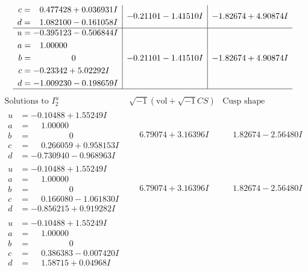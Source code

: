 \documentclass[1p]{elsarticle_modified}
\theoremstyle{definition}
\newcommand{\I}{\sqrt{-1}}
\begin{document}
$$\begin{array}{c|c|c}
\begin{aligned}
c &= \phantom{-}0.477428 + 0.036931 I \\
d &= \phantom{-}1.082100 - 0.161058 I\end{aligned}
 & -0.21101 - 1.41510 I & -1.82674 + 4.90874 I \\ \hline\begin{aligned}
u &= -0.395123 - 0.506844 I \\
a &= \phantom{-}1.00000\phantom{ +0.000000I} \\
b &= \phantom{-0.000000 } 0 \\
c &= -0.23342 + 5.02292 I \\
d &= -1.009230 - 0.198659 I\end{aligned}
 & -0.21101 - 1.41510 I & -1.82674 + 4.90874 I\\
 \hline 
 \end{array}$$\newpage$$\begin{array}{c|c|c}  
\text{Solutions to }I^u_{2}& \I (\text{vol} + \sqrt{-1}CS) & \text{Cusp shape}\\
 \hline 
\begin{aligned}
u &= -0.10488 + 1.55249 I \\
a &= \phantom{-}1.00000\phantom{ +0.000000I} \\
b &= \phantom{-0.000000 } 0 \\
c &= \phantom{-}0.266059 + 0.958153 I \\
d &= -0.730940 - 0.968963 I\end{aligned}
 & \phantom{-}6.79074 + 3.16396 I & \phantom{-}1.82674 - 2.56480 I \\ \hline\begin{aligned}
u &= -0.10488 + 1.55249 I \\
a &= \phantom{-}1.00000\phantom{ +0.000000I} \\
b &= \phantom{-0.000000 } 0 \\
c &= \phantom{-}0.166080 - 1.061830 I \\
d &= -0.856215 + 0.919282 I\end{aligned}
 & \phantom{-}6.79074 + 3.16396 I & \phantom{-}1.82674 - 2.56480 I \\ \hline\begin{aligned}
u &= -0.10488 + 1.55249 I \\
a &= \phantom{-}1.00000\phantom{ +0.000000I} \\
b &= \phantom{-0.000000 } 0 \\
c &= \phantom{-}0.386383 - 0.007420 I \\
d &= \phantom{-}1.58715 + 0.04968 I\end{aligned}

\end{array}$$
\end{document}
